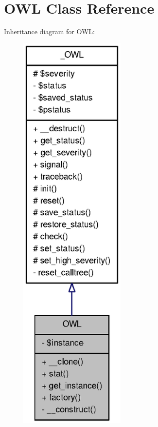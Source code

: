 \section{OWL Class Reference}
\label{classOWL}


Inheritance diagram for OWL:\nopagebreak
\begin{figure}[H]
\begin{center}
\leavevmode
\includegraphics[width=150pt]{classOWL__inherit__graph}
\end{center}
\end{figure}



